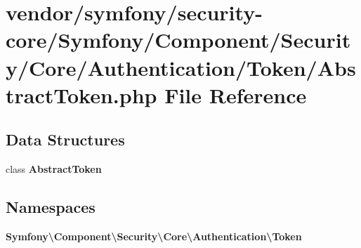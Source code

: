 \section{vendor/symfony/security-\/core/\+Symfony/\+Component/\+Security/\+Core/\+Authentication/\+Token/\+Abstract\+Token.php File Reference}
\label{_abstract_token_8php}
\subsection*{Data Structures}
\begin{DoxyCompactItemize}
\item 
class {\bf Abstract\+Token}
\end{DoxyCompactItemize}
\subsection*{Namespaces}
\begin{DoxyCompactItemize}
\item 
 {\bf Symfony\textbackslash{}\+Component\textbackslash{}\+Security\textbackslash{}\+Core\textbackslash{}\+Authentication\textbackslash{}\+Token}
\end{DoxyCompactItemize}

